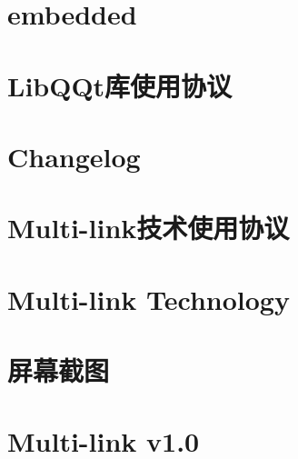 \documentclass[twoside]{book}
\newcommand{\+}{\discretionary{\mbox{\scriptsize$\hookleftarrow$}}{}{}}
\begin{document}
\chapter{embedded}
\label{md__r_1__develop_a0-develop__lib_q_qt_embedded}

\chapter{Lib\+Q\+Qt库使用协议}
\label{md__r_1__develop_a0-develop__lib_q_qt_licence}

\chapter{Changelog}
\label{md__r_1__develop_a0-develop__lib_q_qt_multi-link_changelog}

\chapter{Multi-\/link技术使用协议}
\label{md__r_1__develop_a0-develop__lib_q_qt_multi-link_licence}

\chapter{Multi-\/link Technology}
\label{md__r_1__develop_a0-develop__lib_q_qt_multi-link__r_e_a_d_m_e}

\chapter{屏幕截图}
\label{md__r_1__develop_a0-develop__lib_q_qt_multi-link_screenshot}

\chapter{Multi-\/link v1.0}
\label{md__r_1__develop_a0-develop__lib_q_qt_multi-link_usage}

\end{document}
